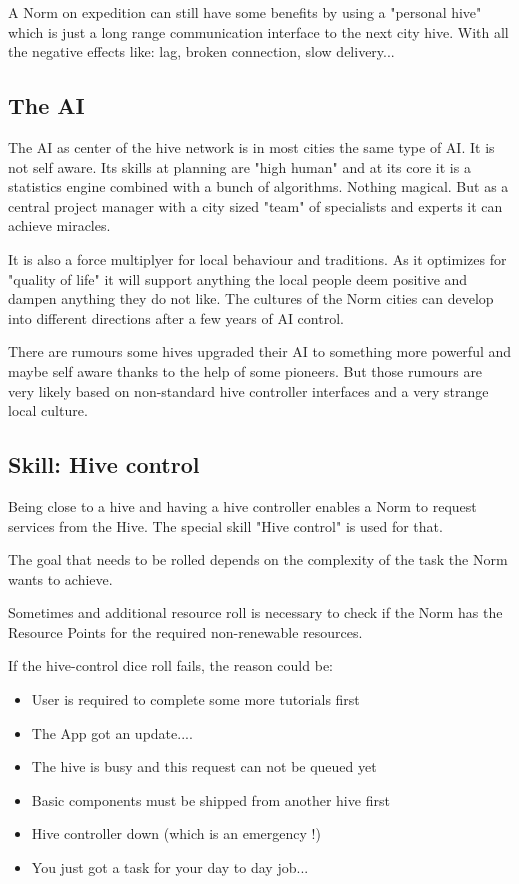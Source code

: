 A Norm on expedition can still have some benefits by using a "personal hive" which is just a long range communication interface to the next city hive. With all the negative effects like: lag, broken connection, slow delivery...

\subsection{The AI}

The AI as center of the hive network is in most cities the same type of AI. It is not self aware. Its skills at planning are "high human" and at its core it is a statistics engine combined with a  bunch of algorithms. Nothing magical. But as a central project manager with a city sized "team" of specialists and experts it can achieve miracles.

It is also a force multiplyer for local behaviour and traditions. As it optimizes for "quality of life" it will support anything the local people deem positive and dampen anything they do not like. The cultures of the Norm cities can develop into different directions after a few years of AI control.

There are rumours some hives upgraded their AI to something more powerful and maybe self aware thanks to the help of some pioneers. But those rumours are very likely based on non-standard hive controller interfaces and a very strange local culture.

\subsection{Skill: Hive control}

Being close to a hive and having a hive controller enables a Norm to request services from the Hive. The special skill "Hive control" is used for that.

The goal that needs to be rolled depends on the complexity of the task the Norm wants to achieve.

Sometimes and additional resource roll is necessary to check if the Norm has the Resource Points  for the required non-renewable resources.

If the hive-control dice roll fails, the reason could be:
\begin{itemize}
    \item User is required to complete some more tutorials first
    \item The App got an update....
    \item The hive is busy and this request can not be queued yet
    \item Basic components must be shipped from another hive first
    \item Hive controller down (which is an emergency !)
    \item You just got a task for your day to day job...
\end{itemize}

